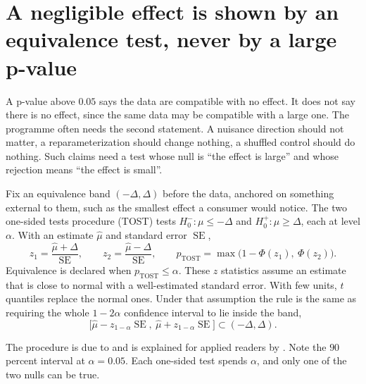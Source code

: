 
\section{A negligible effect is shown by an equivalence test, never by a large p-value}\label{sec:ch09:equiv}

A p-value above $0.05$ says the data are compatible with no effect. It does not say there is no effect, since the same data may be compatible with a large one. The programme often needs the second statement. A nuisance direction should not matter, a reparameterization should change nothing, a shuffled control should do nothing. Such claims need a test whose null is ``the effect is large'' and whose rejection means ``the effect is small''.

\begin{definition}\label{def:ch09:tost}
Fix an equivalence band $(-\Delta,\Delta)$ before the data, anchored on something external to them, such as the smallest effect a consumer would notice. The two one-sided tests procedure (TOST) tests $H_0^-:\mu\le-\Delta$ and $H_0^+:\mu\ge\Delta$, each at level $\alpha$. With an estimate $\hat\mu$ and standard error $\operatorname{SE}$,
\begin{equation}
z_1=\frac{\hat\mu+\Delta}{\operatorname{SE}},\qquad z_2=\frac{\hat\mu-\Delta}{\operatorname{SE}},\qquad p_{\text{TOST}}=\max\big(1-\Phi(z_1),\ \Phi(z_2)\big).
\label{eq:ch09:tost}
\end{equation}
Equivalence is declared when $p_{\text{TOST}}\le\alpha$. These $z$ statistics assume an estimate that is close to normal with a well-estimated standard error. With few units, $t$ quantiles replace the normal ones. Under that assumption the rule is the same as requiring the whole $1-2\alpha$ confidence interval to lie inside the band,
\begin{equation}
\big[\hat\mu-z_{1-\alpha}\operatorname{SE},\ \hat\mu+z_{1-\alpha}\operatorname{SE}\big]\subset(-\Delta,\Delta).
\label{eq:ch09:tostci}
\end{equation}
\end{definition}
The procedure is due to \citet{schuirmann1987} and is explained for applied readers by \citet{lakens2017}. Note the $90$ percent interval at $\alpha=0.05$. Each one-sided test spends $\alpha$, and only one of the two nulls can be true.

